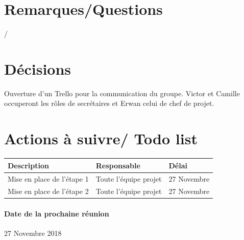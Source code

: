 \documentclass{article}
\begin{document}
\section{Remarques/Questions}
/
\section{Décisions}
Ouverture d'un Trello pour la communication du groupe. Victor et Camille occuperont les rôles de secrétaires et Erwan celui de chef de projet.
\section{Actions à suivre/ Todo list}

\begin{tabular}{|C{5cm}|C{3cm}|C{3cm}|}
\hline {} Description & Responsable & Délai \\
\hline  Mise en place de l'étape 1  & Toute l'équipe projet  & 27 Novembre  \\
\hline 
Mise en place de l'étape 2 & Toute l'équipe projet  & 27 Novembre \\
\hline
\end{tabular}

\paragraph{Date de la prochaine réunion}
27 Novembre 2018
\end{document}

